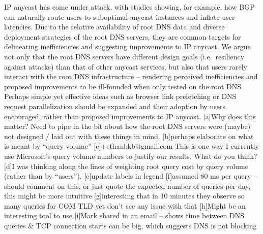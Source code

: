 \documentclass[sigconf,nonacm,10pt]{acmart}
\begin{document}
IP anycast has come under attack, with studies showing, for example, how
BGP can naturally route users to suboptimal anycast instances and
inflate user latencies. Due to the relative availability of root DNS
data and diverse deployment strategies of the root DNS servers, they are
common targets for delineating inefficiencies and suggesting
improvements to IP anycast. We argue not only that the root DNS servers
have different design goals (i.e.~resiliency against attacks) than that
of other anycast services, but also that users rarely interact with the
root DNS infrastructure -- rendering perceived inefficiencies and
proposed improvements to be ill-founded when only tested on the root
DNS. Perhaps simple yet effective ideas such as browser link prefetching
or DNS request parallelization should be expanded and their adoption by
users encouraged, rather than proposed improvements to IP anycast.
{[}a{]}Why does this matter? Need to pipe in the bit about how the root
DNS servers were (maybe) not designed / laid out with these things in
mind. {[}b{]}perhaps elaborate on what is meant by ``query volume''
{[}c{]}+ethanbkb@gmail.com This is one way I currently use Microsoft's
query volume numbers to justify our results. What do you think? {[}d{]}I
was thinking along the lines of weighting root query cost by query
volume (rather than by ``users''). {[}e{]}update labels in legend
{[}f{]}assumed 80 ms per query -- should comment on this, or just quote
the expected number of queries per day, this might be more intuitive
{[}g{]}interesting that in 10 minutes they observe so many queries for
COM TLD yet don't see any issue with that {[}h{]}Might be an interesting
tool to use {[}i{]}Mark shared in an email -- shows time between DNS
queries \& TCP connection starts can be big, which suggests DNS is not
blocking


\end{document}
